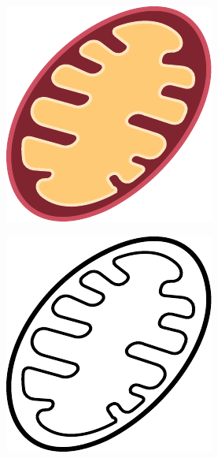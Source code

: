 \begin{figure}[h]
\begin{subfigure}[t]{0.2\linewidth}
    \end{subfigure}
    \begin{subfigure}[t]{0.2\linewidth}
        \includegraphics[width=\textwidth]{chapters/images/mitochondria-color-lines}
    \end{subfigure}
    \begin{subfigure}[t]{0.2\linewidth}
        \includegraphics[width=\textwidth]{chapters/images/mitochondria-only-lines}

\end{subfigure}
\end{figure}
